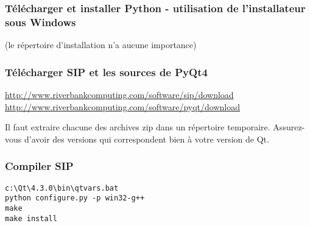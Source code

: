 \subsubsection{Télécharger et installer Python - utilisation de l'installateur sous Windows}
(le répertoire d'installation n'a aucune importance)


\subsubsection{Télécharger SIP et les sources de PyQt4}
\url{http://www.riverbankcomputing.com/software/sip/download} \\
\url{http://www.riverbankcomputing.com/software/pyqt/download}

Il faut extraire chacune des archives zip dans un répertoire temporaire. Assurez-vous d'avoir des versions qui correspondent bien à votre version de Qt.

%
%
%

\subsubsection{Compiler SIP}
\begin{verbatim}
c:\Qt\4.3.0\bin\qtvars.bat 
python configure.py -p win32-g++ 
make 
make install 
\end{verbatim}

